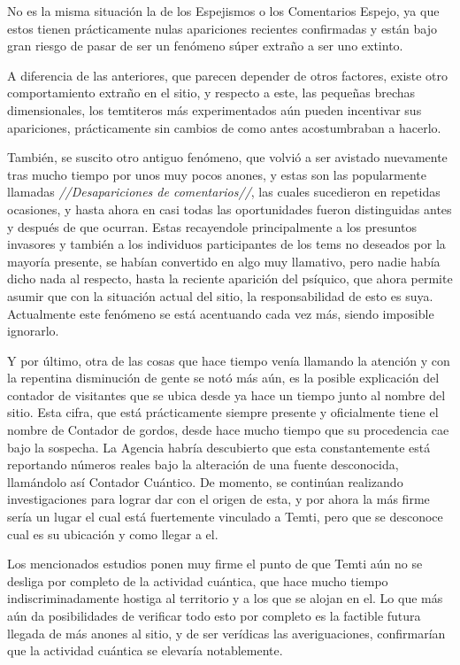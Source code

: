 \documentclass[
  spanish,
]{book}
\begin{document}
No es la misma situación la de los Espejismos o los Comentarios Espejo, ya que estos tienen prácticamente nulas apariciones recientes confirmadas y están bajo gran riesgo de pasar de ser un fenómeno súper extraño a ser uno extinto.

A diferencia de las anteriores, que parecen depender de otros factores, existe otro comportamiento extraño en el sitio, y respecto a este, las pequeñas brechas dimensionales, los temtiteros más experimentados aún pueden incentivar sus apariciones, prácticamente sin cambios de como antes acostumbraban a hacerlo.

También, se suscito otro antiguo fenómeno, que volvió a ser avistado nuevamente tras mucho tiempo por unos muy pocos anones, y estas son las popularmente llamadas \emph{//Desapariciones de comentarios//}, las cuales sucedieron en repetidas ocasiones, y hasta ahora en casi todas las oportunidades fueron distinguidas antes y después de que ocurran.
Estas recayendole principalmente a los presuntos invasores y también a los individuos participantes de los tems no deseados por la mayoría presente, se habían convertido en algo muy llamativo, pero nadie había dicho nada al respecto, hasta la reciente aparición del psíquico, que ahora permite asumir que con la situación actual del sitio, la responsabilidad de esto es suya. Actualmente este fenómeno se está acentuando cada vez más, siendo imposible ignorarlo.

Y por último, otra de las cosas que hace tiempo venía llamando la atención y con la repentina disminución de gente se notó más aún, es la posible explicación del contador de visitantes que se ubica desde ya hace un tiempo junto al nombre del sitio. Esta cifra, que está prácticamente siempre presente y oficialmente tiene el nombre de Contador de gordos, desde hace mucho tiempo que su procedencia cae bajo la sospecha. La Agencia habría descubierto que esta constantemente está reportando números reales bajo la alteración de una fuente desconocida, llamándolo así Contador Cuántico. De momento, se continúan realizando investigaciones para lograr dar con el origen de esta, y por ahora la más firme sería un lugar el cual está fuertemente vinculado a Temti, pero que se desconoce cual es su ubicación y como llegar a el.

Los mencionados estudios ponen muy firme el punto de que Temti aún no se desliga por completo de la actividad cuántica, que hace mucho tiempo indiscriminadamente hostiga al territorio y a los que se alojan en el. Lo que más aún da posibilidades de verificar todo esto por completo es la factible futura llegada de más anones al sitio, y de ser verídicas las averiguaciones, confirmarían que la actividad cuántica se elevaría notablemente.
\end{document}
